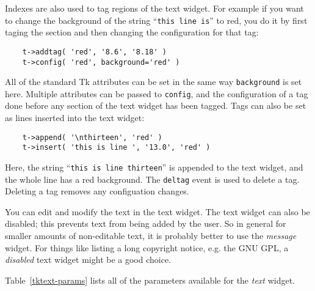 Indexes are also used to tag regions of the text widget. For example
if you want to change the background of the string ``{\tt this line is}''
to red, you do it by first taging the section and then changing the
configuration for that tag:
\begin{verbatim}
    t->addtag( 'red', '8.6', '8.18' )
    t->config( 'red', background='red' )
\end{verbatim}
All of the standard Tk attributes can be set in the same way {\tt background}
is set here. Multiple attributes can be passed to {\tt config}, and the
configuration of a tag done before any section of the text widget has
been tagged. Tags can also be set as lines inserted into the text widget:
\begin{verbatim}
    t->append( '\nthirteen', 'red' )
    t->insert( 'this is line ', '13.0', 'red' )
\end{verbatim}
Here, the string ``{\tt this is line thirteen}'' is appended to the text
widget, and the whole line has a red background. The {\tt deltag} event
is used to delete a tag. Deleting a tag removes any configuation
changes.

You can edit and modify the text in the text widget. The
text widget can also be disabled; this prevents text from being
added by the user. So in general for smaller amounts of non-editable
text, it is probably better to use the {\em message} widget. For things like
listing a long copyright notice, e.g. the GNU GPL, a {\em disabled} text widget
might be a good choice.

Table~\ref{tktext-params} lists all of the parameters available for the {\em text}
widget.

